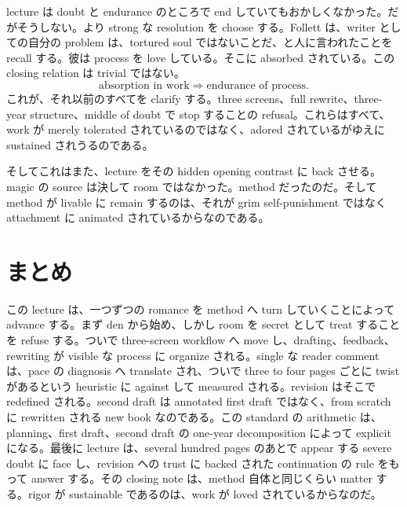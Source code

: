 lecture は doubt と endurance のところで end していてもおかしくなかった。だがそうしない。より strong な resolution を choose する。Follett は、writer としての自分の problem は、tortured soul ではないことだ、と人に言われたことを recall する。彼は process を love している。そこに absorbed されている。この closing relation は trivial ではない。
\begin{equation}
\text{absorption in work} \Rightarrow \text{endurance of process}.
\end{equation}
これが、それ以前のすべてを clarify する。three screens、full rewrite、three-year structure、middle of doubt で stop することの refusal。これらはすべて、work が merely tolerated されているのではなく、adored されているがゆえに sustained されうるのである。

そしてこれはまた、lecture をその hidden opening contrast に back させる。magic の source は決して room ではなかった。method だったのだ。そして method が livable に remain するのは、それが grim self-punishment ではなく attachment に animated されているからなのである。

\section{まとめ}

この lecture は、一つずつの romance を method へ turn していくことによって advance する。まず den から始め、しかし room を secret として treat することを refuse する。ついで three-screen workflow へ move し、drafting、feedback、rewriting が visible な process に organize される。single な reader comment は、pace の diagnosis へ translate され、ついで three to four pages ごとに twist があるという heuristic に against して measured される。revision はそこで redefined される。second draft は annotated first draft ではなく、from scratch に rewritten される new book なのである。この standard の arithmetic は、planning、first draft、second draft の one-year decomposition によって explicit になる。最後に lecture は、several hundred pages のあとで appear する severe doubt に face し、revision への trust に backed された continuation の rule をもって answer する。その closing note は、method 自体と同じくらい matter する。rigor が sustainable であるのは、work が loved されているからなのだ。